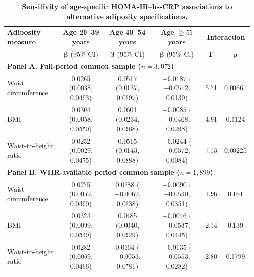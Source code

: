 \begin{landscape}

\begin{table}[htbp]
\centering
\caption{\textbf{Sensitivity of age-specific HOMA-IR--hs-CRP associations
to alternative adiposity specifications.}}
\label{tab:S2}

\small
\setlength{\tabcolsep}{7pt}
\renewcommand{\arraystretch}{1.15}

\begin{tabular}{lccccc}
\hline

\textbf{Adiposity measure} &
\textbf{Age 20--39 years} &
\textbf{Age 40--54 years} &
\textbf{Age $\geq55$ years} &
\multicolumn{2}{c}{\textbf{Interaction}} \\

&
$\boldsymbol{\beta}$ (95\% CI) &
$\boldsymbol{\beta}$ (95\% CI) &
$\boldsymbol{\beta}$ (95\% CI) &
$\boldsymbol{F}$ &
$\boldsymbol{p}$ \\

\hline

\multicolumn{6}{l}{\textbf{Panel A. Full-period common sample
($n=3{,}072$)}} \\[2pt]

Waist circumference &
0.0265 (0.0038, 0.0493) &
0.0517 (0.0137, 0.0897) &
$-0.0187$ ($-0.0512$, 0.0139) &
5.71 &
0.00661 \\

BMI &
0.0304 (0.0058, 0.0550) &
0.0601 (0.0234, 0.0968) &
$-0.0085$ ($-0.0468$, 0.0298) &
4.91 &
0.0124 \\

Waist-to-height ratio &
0.0252 (0.0029, 0.0475) &
0.0515 (0.0143, 0.0888) &
$-0.0244$ ($-0.0572$, 0.0084) &
7.13 &
0.00225 \\

\hline

\multicolumn{6}{l}{\textbf{Panel B. WHR-available period common sample
($n=1{,}899$)}} \\[2pt]

Waist circumference &
0.0275 (0.0059, 0.0490) &
0.0388 ($-0.0062$, 0.0838) &
$-0.0090$ ($-0.0530$, 0.0351) &
1.96 &
0.161 \\

BMI &
0.0324 (0.0099, 0.0549) &
0.0485 (0.0040, 0.0929) &
$-0.0046$ ($-0.0537$, 0.0445) &
2.14 &
0.139 \\

Waist-to-height ratio &
0.0282 (0.0069, 0.0496) &
0.0364 ($-0.0053$, 0.0781) &
$-0.0135$ ($-0.0553$, 0.0282) &
2.80 &
0.0799 \\


\end{tabular}
\end{table}
\end{landscape}

